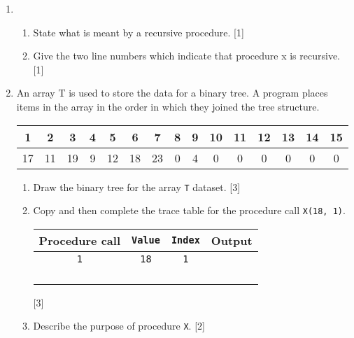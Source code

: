 \begin{enumerate}
\item {}
\begin{enumerate}
\item State what is meant by a recursive procedure. \hfill{}{[}1{]}
\item Give the two line numbers which indicate that procedure x is recursive.
\hfill{} {[}1{]}
\end{enumerate}
\item An array T is used to store the data for a binary tree. A program
places items in the array in the order in which they joined the tree
structure. 
\begin{center}
\begin{tabular}{|c|c|c|c|c|c|c|c|c|c|c|c|c|c|c|}
\hline 
1 & 2 & 3 & 4 & 5 & 6 & 7 & 8 & 9 & 10 & 11 & 12 & 13 & 14 & 15\tabularnewline
\hline 
17 & 11 & 19 & 9 & 12 & 18 & 23 & 0 & 4 & 0 & 0 & 0 & 0 & 0 & 0\tabularnewline
\hline 
\end{tabular}
\par\end{center}
\begin{enumerate}
\item Draw the binary tree for the array \texttt{T} dataset. \hfill{} {[}3{]}
\item Copy and then complete the trace table for the procedure call \texttt{X(18,
1)}.
\begin{center}
\begin{tabular}{|c|c|c|c|}
\hline 
Procedure call & \texttt{Value} & \texttt{Index} & Output\tabularnewline
\hline 
\texttt{1} & \texttt{18} & \texttt{1} & \tabularnewline
\hline 
 &  &  & \tabularnewline
\hline 
 &  &  & \tabularnewline
\hline 
 &  &  & \tabularnewline
\hline 
 &  &  & \tabularnewline
\hline 
\end{tabular} 
\par\end{center}

\begin{center}
\hfill{}{[}3{]}
\par\end{center}
\item Describe the purpose of procedure \texttt{X}. \hfill{}{[}2{]}
\end{enumerate}
\end{enumerate}